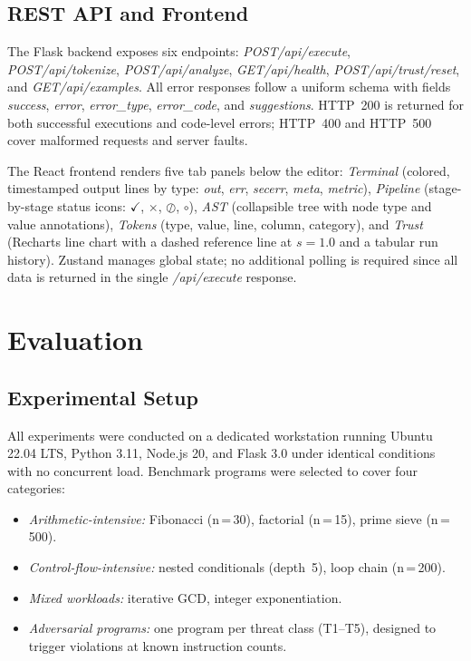 \documentclass[conference]{IEEEtran}
\begin{document}
\subsection{REST API and Frontend}

The Flask backend exposes six endpoints:
\textit{POST\;/api/execute},
\textit{POST\;/api/tokenize},
\textit{POST\;/api/analyze},
\textit{GET\;/api/health},
\textit{POST\;/api/trust/reset}, and
\textit{GET\;/api/examples}.
All error responses follow a uniform schema with fields
\textit{success}, \textit{error}, \textit{error\_type},
\textit{error\_code}, and \textit{suggestions}. HTTP~200 is
returned for both successful executions and code-level errors;
HTTP~400 and HTTP~500 cover malformed requests and server faults.

The React frontend renders five tab panels below the editor:
\emph{Terminal} (colored, timestamped output lines by type:
\textit{out}, \textit{err}, \textit{secerr}, \textit{meta},
\textit{metric}), \emph{Pipeline} (stage-by-stage status icons:
$\checkmark$, $\times$, $\oslash$, $\circ$), \emph{AST}
(collapsible tree with node type and value annotations),
\emph{Tokens} (type, value, line, column, category), and
\emph{Trust} (Recharts line chart with a dashed reference line at
$s=1.0$ and a tabular run history). Zustand manages global state;
no additional polling is required since all data is returned in the
single \textit{/api/execute} response.

\section{Evaluation}
\label{sec:eval}

\subsection{Experimental Setup}

All experiments were conducted on a dedicated workstation running
Ubuntu 22.04 LTS, Python 3.11, Node.js 20, and Flask 3.0 under
identical conditions with no concurrent load. Benchmark programs
were selected to cover four categories:

\begin{itemize}
  \setlength\itemsep{1pt}
  \item \emph{Arithmetic-intensive:} Fibonacci (n\,=\,30), factorial
        (n\,=\,15), prime sieve (n\,=\,500).
  \item \emph{Control-flow-intensive:} nested conditionals (depth~5),
        loop chain (n\,=\,200).
  \item \emph{Mixed workloads:} iterative GCD, integer
        exponentiation.
  \item \emph{Adversarial programs:} one program per threat class
        (T1--T5), designed to trigger violations at known
        instruction counts.
\end{itemize}
\end{document}
